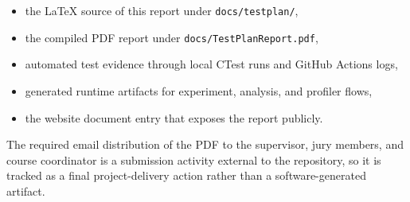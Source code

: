 \begin{itemize}[nosep]
	\item the LaTeX source of this report under \texttt{docs/testplan/},
	\item the compiled PDF report under \texttt{docs/TestPlanReport.pdf},
	\item automated test evidence through local CTest runs and GitHub Actions logs,
	\item generated runtime artifacts for experiment, analysis, and profiler flows,
	\item the website document entry that exposes the report publicly.
\end{itemize}

The required email distribution of the PDF to the supervisor, jury members, and course
coordinator is a submission activity external to the repository, so it is tracked as a final
project-delivery action rather than a software-generated artifact.
